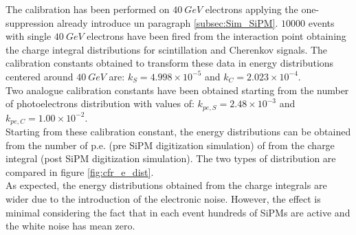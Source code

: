 The calibration has been performed on $40\ GeV$ electrons applying the one-suppression already introduce un paragraph \ref{subsec:Sim_SiPM}. $10000$ events with single $40\ GeV$ electrons have been fired from the interaction point obtaining the charge integral distributions for scintillation and Cherenkov signals.%
The calibration constants obtained to transform these data in energy distributions centered around $40\ GeV$ are: $k_S = 4.998 \times 10^{-5}$ and $k_C = 2.023 \times 10^{-4}$.\\
Two analogue calibration constants have been obtained starting from the number of photoelectrons distribution with values of:  $k_{pe,S} = 2.48 \times 10^{-3}$ and $k_{pe,C} = 1.00 \times 10^{-2}$.\\


Starting from these calibration constant, the energy distributions can be obtained from the number of p.e. (pre SiPM digitization simulation) of from the charge integral (post SiPM digitization simulation). The two types of distribution are compared in figure \ref{fig:cfr_e_dist}.\\
As expected, the energy distributions obtained from the charge integrals are wider due to the introduction of the electronic noise. However, the effect is minimal considering the fact that in each event hundreds of SiPMs are active and the white noise has mean zero.\\

